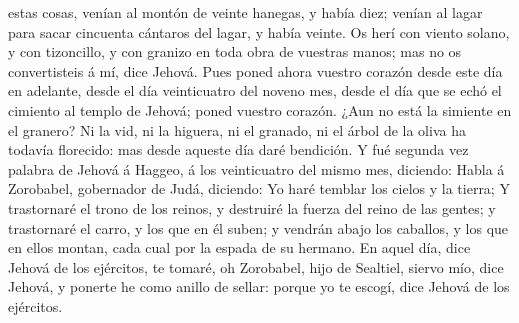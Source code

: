estas cosas, venían al montón de veinte hanegas, y había diez; venían al
lagar para sacar cincuenta cántaros del lagar, y había veinte.
 Os herí con viento solano, y con tizoncillo, y con granizo
en toda obra de vuestras manos; mas no os convertisteis á mí, dice
Jehová.  Pues poned ahora vuestro corazón desde este día en
adelante, desde el día veinticuatro del noveno mes, desde el día que se
echó el cimiento al templo de Jehová; poned vuestro corazón.
 ¿Aun no está la simiente en el granero? Ni la vid, ni la
higuera, ni el granado, ni el árbol de la oliva ha todavía florecido:
mas desde aqueste día daré bendición.  Y fué segunda vez
palabra de Jehová á Haggeo, á los veinticuatro del mismo mes, diciendo:
 Habla á Zorobabel, gobernador de Judá, diciendo: Yo haré
temblar los cielos y la tierra;  Y trastornaré el trono de
los reinos, y destruiré la fuerza del reino de las gentes; y trastornaré
el carro, y los que en él suben; y vendrán abajo los caballos, y los que
en ellos montan, cada cual por la espada de su hermano.  En
aquel día, dice Jehová de los ejércitos, te tomaré, oh Zorobabel, hijo
de Sealtiel, siervo mío, dice Jehová, y ponerte he como anillo de
sellar: porque yo te escogí, dice Jehová de los ejércitos.

